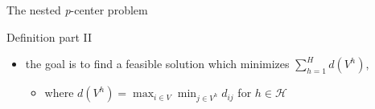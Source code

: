 \documentclass[utf8,aspectratio=1610,ngerman,english]{beamer}
\begin{document}
\begin{frame}{The nested \textit{p}-center problem}
\begin{minipage}{0.48\textwidth}
\begin{block}{Definition part II}
\begin{itemize}
                      \begin{itemize}
                          \item with $\left\lvert V^h \right\rvert = p^h$ for $h \in \mathcal H$,
                          \item for which $V^h \subseteq V^{h+1}$ for $h = 1, \dots, H-1$ holds \pause
                      \end{itemize}
                \item the goal is to find a feasible solution which minimizes $\sum_{h = 1}^{H} d(V^h)$,
                      \begin{itemize}
                          \item where $d(V^h) = \max_{i \in V}\min_{j \in V^h} d_{ij}$ for $h \in \mathcal H$
                      \end{itemize}
            \end{itemize}
        \end{block}
    \end{minipage}
\end{frame}

\end{document}
